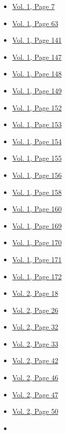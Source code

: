 \begin{itemize}
  \begin{itemize}
  \tightlist
  \item
    \protect\hyperlink{g-page-15}{Vol. 1, Page 7}
  \item
    \protect\hyperlink{g-page-71}{Vol. 1, Page 63}
  \item
    \protect\hyperlink{g-page-149}{Vol. 1, Page 141}
  \item
    \protect\hyperlink{g-page-155}{Vol. 1, Page 147}
  \item
    \protect\hyperlink{g-page-156}{Vol. 1, Page 148}
  \item
    \protect\hyperlink{g-page-157}{Vol. 1, Page 149}
  \item
    \protect\hyperlink{g-page-160}{Vol. 1, Page 152}
  \item
    \protect\hyperlink{g-page-161}{Vol. 1, Page 153}
  \item
    \protect\hyperlink{g-page-162}{Vol. 1, Page 154}
  \item
    \protect\hyperlink{g-page-163}{Vol. 1, Page 155}
  \item
    \protect\hyperlink{g-page-164}{Vol. 1, Page 156}
  \item
    \protect\hyperlink{g-page-166}{Vol. 1, Page 158}
  \item
    \protect\hyperlink{g-page-168}{Vol. 1, Page 160}
  \item
    \protect\hyperlink{g-page-177}{Vol. 1, Page 169}
  \item
    \protect\hyperlink{g-page-178}{Vol. 1, Page 170}
  \item
    \protect\hyperlink{g-page-179}{Vol. 1, Page 171}
  \item
    \protect\hyperlink{g-page-180}{Vol. 1, Page 172}
  \item
    \protect\hyperlink{g-page-230}{Vol. 2, Page 18}
  \item
    \protect\hyperlink{g-page-238}{Vol. 2, Page 26}
  \item
    \protect\hyperlink{g-page-244}{Vol. 2, Page 32}
  \item
    \protect\hyperlink{g-page-245}{Vol. 2, Page 33}
  \item
    \protect\hyperlink{g-page-254}{Vol. 2, Page 42}
  \item
    \protect\hyperlink{g-page-258}{Vol. 2, Page 46}
  \item
    \protect\hyperlink{g-page-259}{Vol. 2, Page 47}
  \item
    \protect\hyperlink{g-page-262}{Vol. 2, Page 50}
  \item

\end{itemize}
\end{itemize}
